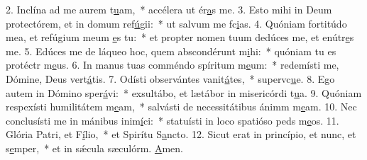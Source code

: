 2. Inclína ad me aurem t\uline{u}am,~* accélera ut ér\uline{a}s me.
3. Esto mihi in Deum protectórem, et in domum ref\uline{ú}gii:~* ut salvum me fc\uline{i}as.
4. Quóniam fortitúdo mea, et refúgium meum \uline{e}s tu:~* et propter nomen tuum dedúces me, et enútr\uline{e}s me.
5. Edúces me de láqueo hoc, quem abscondérunt m\uline{i}hi:~* quóniam tu es protéctr m\uline{e}us.
6. In manus tuas comméndo spíritum m\uline{e}um:~* redemísti me, Dómine, Deus vert\uline{á}tis.
7. Odísti observántes vanit\uline{á}tes,~* supervc\uline{u}e.
8. Ego autem in Dómino sper\uline{á}vi:~* exsultábo, et lætábor in misericórdi t\uline{u}a.
9. Quóniam respexísti humilitátem m\uline{e}am,~* salvásti de necessitátibus ánimm m\uline{e}am.
10. Nec conclusísti me in mánibus inim\uline{í}ci:~* statuísti in loco spatióso peds m\uline{e}os.
11. Glória Patri, et F\uline{í}lio,~* et Spirítu S\uline{a}ncto.
12. Sicut erat in princípio, et nunc, et s\uline{e}mper,~* et in sǽcula sæculórm. \uline{A}men.
